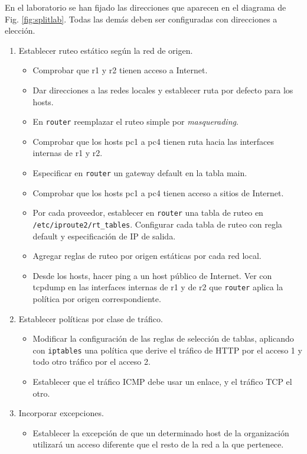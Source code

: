 En el laboratorio se han fijado las direcciones que aparecen en el diagrama de Fig. \ref{fig:splitlab}. Todas las demás deben ser configuradas con direcciones a elección. 
\begin{enumerate} 
	\item Establecer ruteo estático según la red de origen.
	\begin{itemize}
	\item Comprobar que r1 y r2 tienen acceso a Internet. 
	\item Dar direcciones a las redes locales y establecer ruta por defecto para los hosts. 
	\item En \texttt{router} reemplazar el ruteo simple por \textit{masquerading}.	
	\item Comprobar que los hosts pc1 a pc4 tienen ruta hacia las interfaces internas de r1 y r2. 
	\item Especificar en \texttt{router} un gateway default en la tabla main. 
	\item Comprobar que los hosts pc1 a pc4 tienen acceso a sitios de Internet. 
	\item Por cada proveedor, establecer en \texttt{router} una tabla de ruteo en \texttt{/etc/iproute2/rt\_tables}. Configurar cada tabla de ruteo con regla default y especificación de IP de salida. 
	\item Agregar reglas de ruteo por origen estáticas por cada red local. 
	\item Desde los hosts, hacer ping a un host público de Internet. Ver con tcpdump en las interfaces internas de r1 y de r2 que \texttt{router}  aplica la política por origen correspondiente. 
	\end{itemize}
	\item Establecer políticas por clase de tráfico.
	\begin{itemize}
		\item Modificar la configuración de las reglas de selección de tablas, aplicando con \texttt{iptables} una política que derive el tráfico de HTTP por el acceso 1 y todo otro tráfico por el acceso 2.
		\item Establecer que el tráfico ICMP debe usar un enlace, y el tráfico TCP el otro.
	\end{itemize}
	\item Incorporar excepciones.
	\begin{itemize}
		\item Establecer la excepción de que un determinado host de la organización utilizará un acceso diferente que el resto de la red a la que pertenece.	

\end{itemize}
\end{enumerate}
